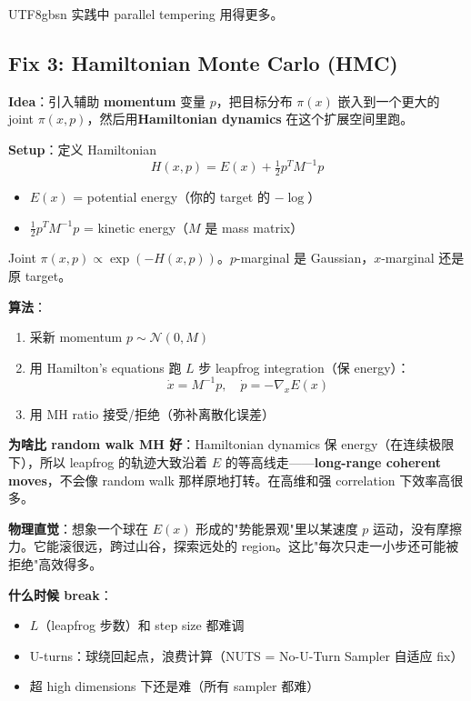 \documentclass[11pt]{article}
\begin{document}
\begin{CJK}{UTF8}{gbsn}
实践中 parallel tempering 用得更多。

\subsection{Fix 3: Hamiltonian Monte Carlo (HMC)}

\textbf{Idea}：引入辅助 \textbf{momentum} 变量 $p$，把目标分布 $\pi(x)$ 嵌入到一个更大的 joint $\pi(x, p)$，然后用\textbf{Hamiltonian dynamics} 在这个扩展空间里跑。

\textbf{Setup}：定义 Hamiltonian
\[
H(x, p) = E(x) + \tfrac{1}{2} p^T M^{-1} p
\]
\begin{itemize}[nosep]
  \item $E(x)$ = potential energy（你的 target 的 $-\log$）
  \item $\tfrac{1}{2} p^T M^{-1} p$ = kinetic energy（$M$ 是 mass matrix）
\end{itemize}
Joint $\pi(x, p) \propto \exp(-H(x, p))$。$p$-marginal 是 Gaussian，$x$-marginal 还是原 target。

\textbf{算法}：
\begin{enumerate}[nosep]
  \item 采新 momentum $p \sim \mathcal{N}(0, M)$
  \item 用 Hamilton's equations 跑 $L$ 步 leapfrog integration（保 energy）：
    \[
    \dot{x} = M^{-1} p, \quad \dot{p} = -\nabla_x E(x)
    \]
  \item 用 MH ratio 接受/拒绝（弥补离散化误差）
\end{enumerate}

\textbf{为啥比 random walk MH 好}：Hamiltonian dynamics 保 energy（在连续极限下），所以 leapfrog 的轨迹大致沿着 $E$ 的等高线走——\textbf{long-range coherent moves}，不会像 random walk 那样原地打转。在高维和强 correlation 下效率高很多。

\textbf{物理直觉}：想象一个球在 $E(x)$ 形成的"势能景观"里以某速度 $p$ 运动，没有摩擦力。它能滚很远，跨过山谷，探索远处的 region。这比"每次只走一小步还可能被拒绝"高效得多。

\textbf{什么时候 break}：
\begin{itemize}[nosep]
  \item $L$（leapfrog 步数）和 step size 都难调
  \item U-turns：球绕回起点，浪费计算（NUTS = No-U-Turn Sampler 自适应 fix）
  \item 超 high dimensions 下还是难（所有 sampler 都难）
\end{itemize}


\end{CJK}
\end{document}
